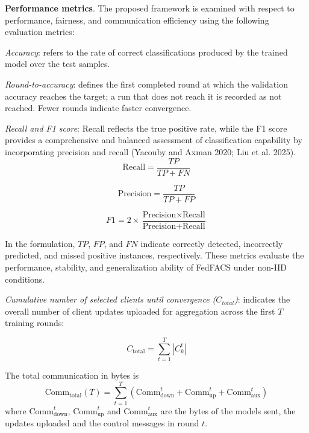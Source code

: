 \documentclass[pdflatex,sn-mathphys-num,oneside]{sn-jnl}%
\theoremstyle{thmstyleone}%
\theoremstyle{thmstyletwo}%
\theoremstyle{thmstylethree}%
\begin{document}
\textbf{Performance metrics}. The proposed framework is examined with respect to performance, fairness, and communication efficiency using the following evaluation metrics:

\textit{Accuracy}: refers to the rate of correct classifications produced by the trained model over the test samples.

\textit{Round-to-accuracy}: defines the first completed round at which the validation accuracy reaches the target; a run that does not reach it is recorded as not reached. Fewer rounds indicate faster convergence.

\textit{Recall and F1 score}: Recall reflects the true positive rate, while the F1 score provides a comprehensive and balanced assessment of classification capability by incorporating precision and recall (Yacouby and Axman 2020; Liu et al. 2025). 
\begin{equation}
\text{Recall} = \frac{TP}{TP + FN}
\label{eq:recall}
\end{equation}

\begin{equation}
\text{Precision} = \frac{TP}{TP + FP}
\label{eq:precision}
\end{equation}

\begin{equation}
F1 = 2 \times \frac{\text{Precision} \times \text{Recall}}
{\text{Precision} + \text{Recall}}
\label{eq:f1_score}
\end{equation}



In the formulation, $TP$, $FP$, and $FN$ indicate correctly detected, incorrectly predicted, and missed positive instances, respectively. These metrics evaluate the performance, stability, and generalization ability of FedFACS under non-IID conditions.


\textit{Cumulative number of selected clients until convergence  ($C_{total}$)}: indicates the overall number of client updates uploaded for aggregation across the first $T$ training rounds:

\begin{equation}
C_{\text{total}} = \sum_{t=1}^{T} \left|C_k^t\right|
\label{eq:communication}
\end{equation}

The total communication in bytes is
\begin{equation}
\mathrm{Comm}_{\mathrm{total}}(T)=\sum_{t=1}^{T}\left(\mathrm{Comm}^t_{\mathrm{down}}+\mathrm{Comm}^t_{\mathrm{up}}+\mathrm{Comm}^t_{\mathrm{aux}}\right)
\tag{23a}
\end{equation}
where $\mathrm{Comm}^t_{\mathrm{down}}$, $\mathrm{Comm}^t_{\mathrm{up}}$ and $\mathrm{Comm}^t_{\mathrm{aux}}$ are the bytes of the models sent, the updates uploaded and the control messages in round $t$.
\end{document}
